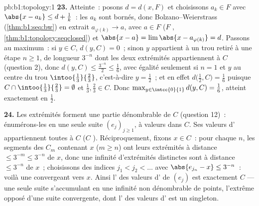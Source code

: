 \begin{solution}{pb:b1:topology:1}
\textbf{23.} Atteinte~: posons $d = d(x, F)$ et choisissons $a_k \in
F$ avec $\abs{x - a_k} \leq d + \frac1k$~: les $a_k$ sont bornés,
donc Bolzano--Weierstrass (\cref{thm:b1:seq:bw}) en extrait
$a_{\varphi(k)} \to a$, avec $a \in F$ ($F$ ,
\cref{thm:b1:topology:seqclosed}) et $\abs{x - a} = \lim
\abs{x - a_{\varphi(k)}} = d$. Passons au maximum~: si $y \in C$,
$d(y, C) = 0$~; sinon $y$ appartient à un trou retiré à une étape
$n \geq 1$,   de longueur $3^{-n}$ dont les deux
extrémités appartiennent à $C$ (question 2), donc $d(y, C) \leq
\frac{3^{-n}}{2} \leq \frac16$, avec égalité seulement si $n = 1$ et
$y$ au centre du trou $\intoo{\frac13}{\frac23}$, c'est-à-dire
$y = \frac12$~; et en effet $d\bigl(\frac12, C\bigr) = \frac16$
puisque $C \cap \intoo{\frac13}{\frac23} = \emptyset$ et
$\frac13, \frac23 \in C$. Donc $\max_{y\in\intcc{0}{1}} d(y, C)
= \frac16$, atteint exactement en $\frac12$.

\textbf{24.} Les extrémités forment une partie dénombrable  de
$C$ (question 12)~: énumérons-les en une seule suite
$(e_j)_{j\geq1}$, à valeurs dans $C$. Ses valeurs d'
appartiennent toutes à $C$ ($C$ ). Réciproquement, fixons $x \in
C$~: pour chaque $n$, les segments des $C_m$ contenant $x$ ($m \geq
n$) ont leurs extrémités à distance $\leq 3^{-m} \leq 3^{-n}$ de $x$,
donc une infinité d'extrémités distinctes sont à distance $\leq
3^{-n}$ de $x$~; choisissons des indices $j_1 < j_2 < \dots$ avec
$\abs{e_{j_n} - x} \leq 3^{-n}$~: voilà une 
convergeant vers $x$. Ainsi l' des valeurs d' de
$(e_j)$ est exactement $C$ --- une seule suite s'accumulant en une
infinité non dénombrable de points, l'extrême opposé d'une suite
convergente, dont l' des valeurs d' est un
singleton.


\end{solution}
